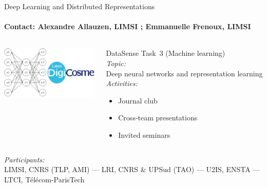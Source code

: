 \begin{frame}{Deep Learning and Distributed Representations}
\framesubtitle{Contact: Alexandre Allauzen, LIMSI ; Emmanuelle Frenoux, LIMSI }

  \begin{columns}
    \begin{column}{3cm}
      \includegraphics[width=\linewidth]{Images/deepnet1.png}
    \end{column}
    \begin{column}{8cm}
      DataSense Task~3 (Machine learning)\\[2ex]

      \emph{Topic:}\\
      Deep neural networks and representation learning\\[2ex]

      \emph{Activities:}
      \begin{itemize}
      \item Journal club
      \item Cross-team presentations
      \item Invited seminars
      \end{itemize}
    \end{column}

  \end{columns}
  \vfill

  \emph{Participants:}\\
    LIMSI, CNRS (TLP, AMI) ---
    LRI, CNRS \& UPSud (TAO) ---
    U2IS, ENSTA ---
    LTCI, Télécom-ParisTech


\end{frame}


